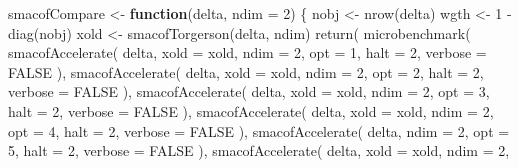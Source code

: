 \documentclass[
  12pt,
  letterpaper,
  DIV=11,
  numbers=noendperiod]{scrartcl}
\newenvironment{Shaded}{\begin{snugshade}}{\end{snugshade}}
\newcommand{\AttributeTok}[1]{\textcolor[rgb]{0.40,0.45,0.13}{#1}}
\newcommand{\ConstantTok}[1]{\textcolor[rgb]{0.56,0.35,0.01}{#1}}
\newcommand{\ControlFlowTok}[1]{\textcolor[rgb]{0.00,0.23,0.31}{\textbf{#1}}}
\newcommand{\DecValTok}[1]{\textcolor[rgb]{0.68,0.00,0.00}{#1}}
\newcommand{\FunctionTok}[1]{\textcolor[rgb]{0.28,0.35,0.67}{#1}}
\newcommand{\NormalTok}[1]{\textcolor[rgb]{0.00,0.23,0.31}{#1}}
\newcommand{\OtherTok}[1]{\textcolor[rgb]{0.00,0.23,0.31}{#1}}
\newcommand{\SpecialCharTok}[1]{\textcolor[rgb]{0.37,0.37,0.37}{#1}}
\begin{document}
\begin{Shaded}
\begin{Highlighting}[]
\NormalTok{smacofCompare }\OtherTok{\textless{}{-}} \ControlFlowTok{function}\NormalTok{(delta, }\AttributeTok{ndim =} \DecValTok{2}\NormalTok{) \{}
\NormalTok{  nobj }\OtherTok{\textless{}{-}} \FunctionTok{nrow}\NormalTok{(delta)}
\NormalTok{  wgth }\OtherTok{\textless{}{-}} \DecValTok{1} \SpecialCharTok{{-}} \FunctionTok{diag}\NormalTok{(nobj)}
\NormalTok{  xold }\OtherTok{\textless{}{-}} \FunctionTok{smacofTorgerson}\NormalTok{(delta, ndim)}
  \FunctionTok{return}\NormalTok{(}
    \FunctionTok{microbenchmark}\NormalTok{(}
      \FunctionTok{smacofAccelerate}\NormalTok{(}
\NormalTok{        delta,}
        \AttributeTok{xold =}\NormalTok{ xold,}
        \AttributeTok{ndim =} \DecValTok{2}\NormalTok{,}
        \AttributeTok{opt =} \DecValTok{1}\NormalTok{,}
        \AttributeTok{halt =} \DecValTok{2}\NormalTok{,}
        \AttributeTok{verbose =} \ConstantTok{FALSE}
\NormalTok{      ),}
      \FunctionTok{smacofAccelerate}\NormalTok{(}
\NormalTok{        delta,}
        \AttributeTok{xold =}\NormalTok{ xold,}
        \AttributeTok{ndim =} \DecValTok{2}\NormalTok{,}
        \AttributeTok{opt =} \DecValTok{2}\NormalTok{,}
        \AttributeTok{halt =} \DecValTok{2}\NormalTok{,}
        \AttributeTok{verbose =} \ConstantTok{FALSE}
\NormalTok{      ),}
      \FunctionTok{smacofAccelerate}\NormalTok{(}
\NormalTok{        delta,}
        \AttributeTok{xold =}\NormalTok{ xold,}
        \AttributeTok{ndim =} \DecValTok{2}\NormalTok{,}
        \AttributeTok{opt =} \DecValTok{3}\NormalTok{,}
        \AttributeTok{halt =} \DecValTok{2}\NormalTok{,}
        \AttributeTok{verbose =} \ConstantTok{FALSE}
\NormalTok{      ),}
      \FunctionTok{smacofAccelerate}\NormalTok{(}
\NormalTok{        delta,}
        \AttributeTok{xold =}\NormalTok{ xold,}
        \AttributeTok{ndim =} \DecValTok{2}\NormalTok{,}
        \AttributeTok{opt =} \DecValTok{4}\NormalTok{,}
        \AttributeTok{halt =} \DecValTok{2}\NormalTok{,}
        \AttributeTok{verbose =} \ConstantTok{FALSE}
\NormalTok{      ),}
      \FunctionTok{smacofAccelerate}\NormalTok{(}
\NormalTok{        delta,}
        \AttributeTok{ndim =} \DecValTok{2}\NormalTok{,}
        \AttributeTok{opt =} \DecValTok{5}\NormalTok{,}
        \AttributeTok{halt =} \DecValTok{2}\NormalTok{,}
        \AttributeTok{verbose =} \ConstantTok{FALSE}
\NormalTok{      ),}
      \FunctionTok{smacofAccelerate}\NormalTok{(}
\NormalTok{        delta,}
        \AttributeTok{xold =}\NormalTok{ xold,}
        \AttributeTok{ndim =} \DecValTok{2}\NormalTok{,}

\end{Highlighting}
\end{Shaded}
\end{document}
